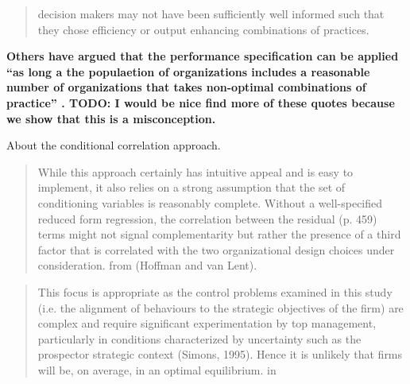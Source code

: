 \documentclass[12pt]{article}
\begin{document}
\begin{quote}
decision makers may not have been sufficiently well informed such that they chose efficiency or output enhancing combinations of practices.
\citep{Carree2011}
\end{quote}

\textbf{Others have argued that the performance specification can be applied ``as long a the populaetion of organizations includes a reasonable number of organizations that takes non-optimal combinations of practice'' \citep{Carree2011}. TODO: I would be nice find more of these quotes because we show that this is a misconception.}

About the conditional correlation approach.
\begin{quote}
While this approach certainly has intuitive appeal and is easy to implement, it also relies on a strong assumption that the set of conditioning variables is reasonably complete. Without a well-specified reduced form regression, the correlation between the residual (p. 459) terms might not signal complementarity but rather the presence of a third factor that is correlated with the two organizational design choices under consideration. from (Hoffman and van Lent).
\end{quote}

\begin{quote}
This focus is appropriate as the control problems examined in this study (i.e. the alignment of behaviours to the strategic objectives of the firm) are complex and require significant experimentation by top management, particularly in conditions characterized by uncertainty such as the prospector strategic context (Simons, 1995). Hence it is unlikely that firms will be, on average, in an optimal equilibrium. in \citep{Bedford2016}
\end{quote}

\newpage



\end{document}
